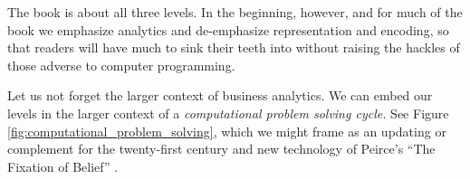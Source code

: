 The book is about all three levels. In the beginning, however, and for much of the book we emphasize analytics and de-emphasize representation and encoding, so that readers  will have much to  sink their teeth into without raising the hackles of those adverse to computer programming.


Let us not forget the larger context of business analytics. We can embed our  levels  in the larger context of a \emph{computational problem solving cycle.} See Figure \ref{fig:computational_problem_solving}, which we might frame as an updating or complement for the twenty-first century and new technology of Peirce's ``The Fixation of Belief''  \cite{peirce_fixation}. 


